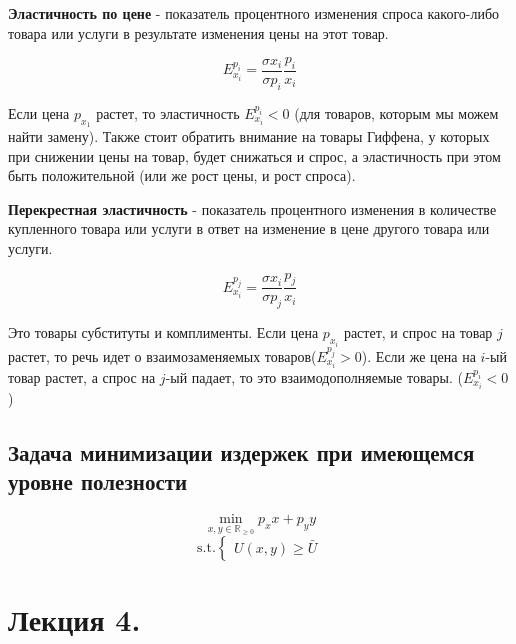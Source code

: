 \documentclass[reqno]{article}
\theoremstyle{definition}
\theoremstyle{definition}
\theoremstyle{definition}
\theoremstyle{definition}
\theoremstyle{definition}
\theoremstyle{definition}
\theoremstyle{definition}
\theoremstyle{definition}
\theoremstyle{definition}
\begin{document}
	\textbf{Эластичность по цене} -  показатель процентного изменения спроса какого-либо товара или услуги в результате изменения цены на этот товар.
	
	$$E_{x_i}^{p_i} = \dfrac{\sigma x_i}{\sigma p_i} \dfrac{p_i}{x_i}$$
	
	Если цена $p_{x_1}$ растет, то эластичность $E_{x_i}^{p_i} < 0$ (для товаров, которым мы можем найти замену). Также стоит обратить внимание на товары Гиффена, у которых при снижении цены на товар, будет снижаться и спрос, а эластичность при этом быть положительной (или же рост цены,  и рост спроса).
	\newpage
	
	\textbf{Перекрестная эластичность} -  показатель процентного изменения в количестве купленного товара или услуги в ответ на изменение в цене другого товара или услуги.
	
	$$E_{x_i}^{p_j} = \dfrac{\sigma x_i}{\sigma p_j} \dfrac{p_j}{x_i}$$
	
	Это товары субституты и комплименты. Если цена $p_{x_i}$ растет, и спрос на товар $j$ растет, то речь идет о взаимозаменяемых товаров($E_{x_i}^{p_j} > 0$). Если же цена на $i$-ый товар растет, а спрос на $j$-ый падает, то это взаимодополняемые товары. ($E_{x_i}^{p_i} < 0$)
	
	\subsection{Задача минимизации издержек при имеющемся уровне полезности}
	
	$$\min_{x,y \in\mathds{R}_{\geq 0}} p_x x + p_y y $$
	$$
	\text{s.t.}
	\begin{cases}
		U(x,y) \geq \bar{U}
	\end{cases}
	$$
	
	\section{Лекция 4.}
	
\end{document}
